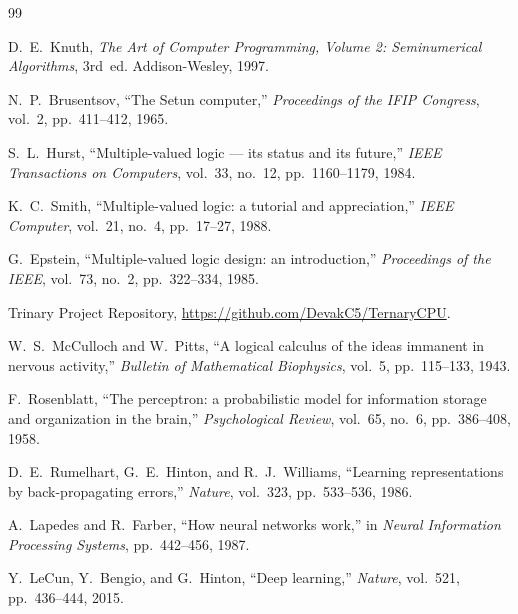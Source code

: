 \documentclass[12pt,a4paper,twoside]{book}
\theoremstyle{trinarytheorem}
\theoremstyle{trinarydefinition}
\begin{document}

\begin{thebibliography}{99}

D.~E.~Knuth, \emph{The Art of Computer Programming, Volume 2: Seminumerical
Algorithms}, 3rd~ed. Addison-Wesley, 1997.

N.~P.~Brusentsov, ``The Setun computer,'' \emph{Proceedings of the IFIP Congress},
vol.~2, pp.~411--412, 1965.

S.~L.~Hurst, ``Multiple-valued logic --- its status and its future,''
\emph{IEEE Transactions on Computers}, vol.~33, no.~12, pp.~1160--1179, 1984.

K.~C.~Smith, ``Multiple-valued logic: a tutorial and appreciation,''
\emph{IEEE Computer}, vol.~21, no.~4, pp.~17--27, 1988.

G.~Epstein, ``Multiple-valued logic design: an introduction,''
\emph{Proceedings of the IEEE}, vol.~73, no.~2, pp.~322--334, 1985.

Trinary Project Repository, \url{https://github.com/DevakC5/TernaryCPU}.

W.~S.~McCulloch and W.~Pitts, ``A logical calculus of the ideas immanent in nervous
activity,'' \emph{Bulletin of Mathematical Biophysics}, vol.~5, pp.~115--133, 1943.

F.~Rosenblatt, ``The perceptron: a probabilistic model for information storage and
organization in the brain,'' \emph{Psychological Review}, vol.~65, no.~6,
pp.~386--408, 1958.

D.~E.~Rumelhart, G.~E.~Hinton, and R.~J.~Williams, ``Learning representations by
back-propagating errors,'' \emph{Nature}, vol.~323, pp.~533--536, 1986.

A.~Lapedes and R.~Farber, ``How neural networks work,'' in \emph{Neural Information
Processing Systems}, pp.~442--456, 1987.

Y.~LeCun, Y.~Bengio, and G.~Hinton, ``Deep learning,'' \emph{Nature}, vol.~521,
pp.~436--444, 2015.

\end{thebibliography}

\printindex
\end{document}
